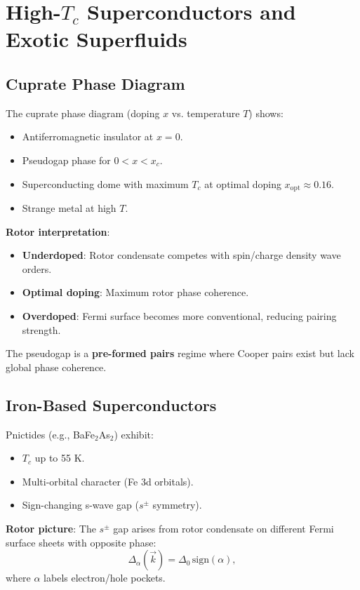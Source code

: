 \documentclass[12pt,a4paper]{article}
\theoremstyle{definition}
\theoremstyle{remark}
\begin{document}
\section{High-$T_c$ Superconductors and Exotic Superfluids}

\subsection{Cuprate Phase Diagram}

The cuprate phase diagram (doping $x$ vs. temperature $T$) shows:
\begin{itemize}
\item Antiferromagnetic insulator at $x=0$.
\item Pseudogap phase for $0 < x < x_c$.
\item Superconducting dome with maximum $T_c$ at optimal doping $x_{\text{opt}} \approx 0.16$.
\item Strange metal at high $T$.
\end{itemize}

\textbf{Rotor interpretation}:
\begin{itemize}
\item \textbf{Underdoped}: Rotor condensate competes with spin/charge density wave orders.
\item \textbf{Optimal doping}: Maximum rotor phase coherence.
\item \textbf{Overdoped}: Fermi surface becomes more conventional, reducing pairing strength.
\end{itemize}

The pseudogap is a \textbf{pre-formed pairs} regime where Cooper pairs exist but lack global phase coherence.

\subsection{Iron-Based Superconductors}

Pnictides (e.g., BaFe$_2$As$_2$) exhibit:
\begin{itemize}
\item $T_c$ up to 55 K.
\item Multi-orbital character (Fe 3d orbitals).
\item Sign-changing s-wave gap ($s^\pm$ symmetry).
\end{itemize}

\textbf{Rotor picture}: The $s^\pm$ gap arises from rotor condensate on different Fermi surface sheets with opposite phase:
\begin{equation}
\Delta_{\alpha}(\vec{k}) = \Delta_0 \, \text{sign}(\alpha),
\end{equation}
where $\alpha$ labels electron/hole pockets.
\end{document}
